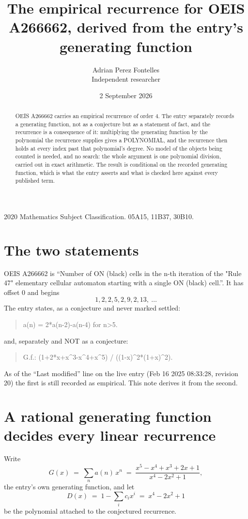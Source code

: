 \documentclass[11pt,a4paper]{article}
\title{The empirical recurrence for OEIS A266662, derived from the entry's generating function}
\author{Adrian Perez Fontelles\\ \small Independent researcher}
\date{2 September 2026}
\theoremstyle{plain}
\theoremstyle{definition}
\begin{document}
\maketitle

\begin{abstract}
OEIS A266662 carries an empirical recurrence of order $4$. The entry separately records a
generating function, not as a conjecture but as a statement of fact, and the recurrence is a
consequence of it: multiplying the generating function by the polynomial the recurrence
supplies gives a POLYNOMIAL, and the recurrence then holds at every index past that
polynomial's degree. No model of the objects being counted is needed, and no search: the
whole argument is one polynomial division, carried out in exact arithmetic. The result is
conditional on the recorded generating function, which is what the entry asserts and what is
checked here against every published term.
\end{abstract}

\noindent\small 2020 Mathematics Subject Classification. 05A15, 11B37, 30B10.\normalsize

\section{The two statements}

OEIS A266662 is ``Number of ON (black) cells in the n-th iteration of the "Rule 47" elementary cellular automaton starting with a single ON (black) cell.''. It has offset $0$ and begins
\[
1, 2, 2, 5, 2, 9, 2, 13,\ \dots
\]
The entry states, as a conjecture and never marked settled:
\begin{quote}
a(n) = 2*a(n-2)-a(n-4) for n>5.
\end{quote}
and, separately and NOT as a conjecture:
\begin{quote}
G.f.: (1+2*x+x\^{}3-x\^{}4+x\^{}5) / ((1-x)\^{}2*(1+x)\^{}2).
\end{quote}
As of the ``Last modified'' line on the live entry (Feb 16 2025 08:33:28, revision 20) the first is still
recorded as empirical. This note derives it from the second.

\section{A rational generating function decides every linear recurrence}

Write
\[
G(x)\;=\;\sum_{n}a(n)\,x^{n}\;=\;\frac{x^{5} - x^{4} + x^{3} + 2 x + 1}{x^{4} - 2 x^{2} + 1},
\]
the entry's own generating function, and let
\[
D(x)\;=\;1-\sum_i c_i x^{i}\;=\;x^{4} - 2 x^{2} + 1
\]
be the polynomial attached to the conjectured recurrence.
\end{document}
